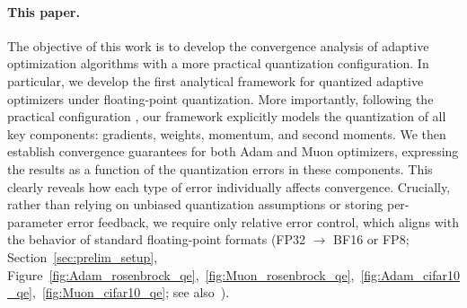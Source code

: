 \documentclass[11pt, letterpaper]{article}
\begin{document}
\paragraph{This paper.} 
The objective of this work is to develop the convergence analysis of adaptive optimization algorithms with a more practical quantization configuration. In particular, we develop the first analytical framework for quantized adaptive optimizers under floating-point quantization. More importantly, following the practical configuration \citep{liu2024deepseek}, our framework explicitly models the quantization of all key components: gradients, weights, momentum, and second moments. We then establish convergence guarantees for both Adam and Muon optimizers, expressing the results as a function of the quantization errors in these components. This clearly reveals how each type of error individually affects convergence. Crucially, rather than relying on unbiased quantization assumptions or storing per-parameter error feedback, we require only relative error control, which aligns with the behavior of standard floating-point formats (FP32 $\to$ BF16 or FP8; Section~\ref{sec:prelim_setup}, Figure~\ref{fig:Adam_rosenbrock_qe},~\ref{fig:Muon_rosenbrock_qe},~\ref{fig:Adam_cifar10_qe},~\ref{fig:Muon_cifar10_qe}; see also~\citep{kuzmin2022fp8}). 
\end{document}
